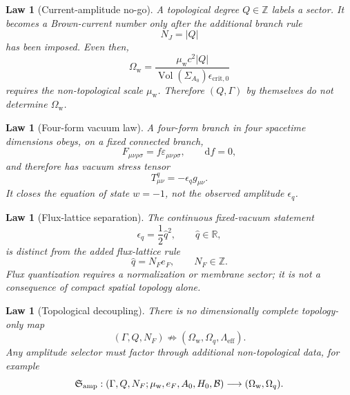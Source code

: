 \documentclass[
  aps,
  prd,
  reprint,
  superscriptaddress,
  floatfix,
  nofootinbib,
  longbibliography
]{revtex4-2}
\theoremstyle{plain}
\newtheorem{law}[theorem]{Law}
\theoremstyle{definition}
\theoremstyle{remark}
\newcommand{\dd}{\mathrm d}
\newcommand{\wind}{\mathrm w}
\newcommand{\eff}{\mathrm{eff}}
\newcommand{\crit}{\mathrm{crit}}
\newcommand{\Ow}{\Omega_{\mathrm w}}
\newcommand{\Oq}{\Omega_q}
\DeclareMathOperator{\Vol}{Vol}
\newcommand{\Z}{\mathbb Z}
\newcommand{\R}{\mathbb R}
\newcommand{\eps}{\epsilon}
\newcommand{\qhat}{\widehat q}
\newcommand{\NF}{N_F}
\newcommand{\eF}{e_F}
\begin{document}
\begin{law}[Current-amplitude no-go]
A topological degree \(Q\in\Z\) labels a sector.  It becomes a Brown-current
number only after the additional branch rule
\begin{equation}
N_J=|Q|
\label{eq:standard_branch_rule_NJQ}
\end{equation}
has been imposed.  Even then,
\begin{equation}
\Ow=
\frac{\mu_{\wind}c^2|Q|}{\Vol(\Sigma_{A_0})\eps_{\crit,0}}
\label{eq:standard_current_amplitude_nogo}
\end{equation}
requires the non-topological scale \(\mu_{\wind}\).  Therefore \((Q,\Gamma)\)
by themselves do not determine \(\Ow\).
\end{law}

\begin{law}[Four-form vacuum law]
A four-form branch in four spacetime dimensions obeys, on a fixed connected
branch,
\begin{equation}
F_{\mu\nu\rho\sigma}=f\varepsilon_{\mu\nu\rho\sigma},
\qquad
\dd f=0,
\end{equation}
and therefore has vacuum stress tensor
\begin{equation}
T^q_{\mu\nu}=-\eps_q g_{\mu\nu}.
\label{eq:standard_four_form_vacuum}
\end{equation}
It closes the equation of state \(w=-1\), not the observed amplitude
\(\eps_q\).
\end{law}

\begin{law}[Flux-lattice separation]
The continuous fixed-vacuum statement
\begin{equation}
\eps_q=\frac12\qhat^2,
\qquad
\qhat\in\R,
\end{equation}
is distinct from the added flux-lattice rule
\begin{equation}
\qhat=\NF\eF,
\qquad
\NF\in\Z .
\end{equation}
Flux quantization requires a normalization or membrane sector; it is not a
consequence of compact spatial topology alone.
\end{law}

\begin{law}[Topological decoupling]
There is no dimensionally complete topology-only map
\begin{equation}
(\Gamma,Q,\NF)\not\Rightarrow(\Ow,\Oq,\Lambda_{\eff}).
\label{eq:standard_topological_decoupling}
\end{equation}
Any amplitude selector must factor through additional non-topological data,
for example
\begin{equation}
\mathfrak S_{\rm amp}:
(\Gamma,Q,\NF;\mu_{\wind},\eF,A_0,H_0,\mathcal B)
\longrightarrow
(\Ow,\Oq).
\label{eq:standard_amp_selector}
\end{equation}
\end{law}
\end{document}
